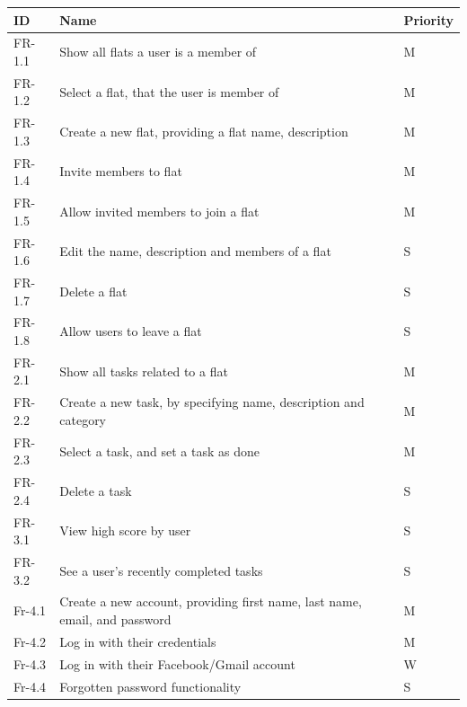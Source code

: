 \documentclass{sig-alt-release2}
\begin{document}
\begin{center}
    \begin{tabular}{ | l | p{3.5cm} | l |}
    \hline
	 \textbf{ID}	& \textbf{Name} & \textbf{Priority} \\ \hline
    FR-1.1	& Show all flats a user is a member of & M \\ \hline
	FR-1.2	& Select a flat, that the user is member of & M \\ \hline
	FR-1.3	& Create a new flat, providing a flat name, description & M \\ \hline
	FR-1.4	& Invite members to flat	& M \\ \hline
	FR-1.5	& Allow invited members to join a flat	&	M \\ \hline
	FR-1.6	& Edit the name, description and members of a flat & S \\ \hline
	FR-1.7	& Delete a flat & S \\ \hline
	FR-1.8	& Allow users to leave a flat & S \\ \hline
	FR-2.1	& Show all tasks related to a flat & M \\ \hline
	FR-2.2	& Create a new task, by specifying name, description and category & M \\ \hline
	FR-2.3	& Select a task, and set a task as done	& M \\ \hline
	FR-2.4	& Delete a task	& S \\ \hline
	FR-3.1	& View high score by user & S \\ \hline
	FR-3.2	& See a user{'}s recently completed tasks	& S \\ \hline
	Fr-4.1	& Create a new account, providing first name, last name, email, and 		password	& M \\ \hline
	Fr-4.2	& Log in with their credentials	& M \\ \hline
	Fr-4.3	& Log in with their Facebook/Gmail account	& W \\ \hline
	Fr-4.4	& Forgotten password functionality	& S \\
    \hline
    \end{tabular}
\end{center}
\end{document}
